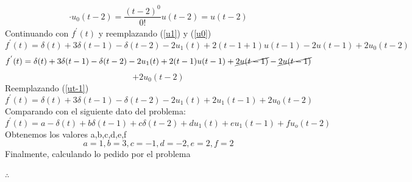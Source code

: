 \documentclass[11pt,a4paper]{article}
\begin{document}
{{\begin{enumerate}
	\begin{eqnarray}
	\label{u0}
	\cdot u_0(t-2)=\dfrac{(t-2)^0}{0!}u(t-2)=u(t-2)
	\end{eqnarray}
	Continuando con $f^{'}(t)$ y reemplazando (\ref{u1}) y (\ref{u0})
	$$f^{'}(t)=\delta(t)+3\delta(t-1)-\delta(t-2)-2u_1(t)+2(t-1+1)u(t-1)-2u(t-1)+2u_0(t-2)$$
	$$f^{'}(t)=\delta(t)+3\delta(t-1)-\delta(t-2)-2u_1(t)+2(t-1)u(t-1)+ \cancel{2u(t-1)}- \cancel{2u(t-1)}$$
	$$+2u_0(t-2)$$
	Reemplazando (\ref{ut-1})
	$$\boxed{f^{'}(t)=\delta(t)+3\delta(t-1)-\delta(t-2)-2u_1(t)+2u_1(t-1)+2u_0(t-2)}$$
	Comparando con el siguiente dato del problema:
	$$f^{'}(t)=a-\delta (t)+b \delta (t-1) +c \delta (t-2) +d u_1(t)+e u_1(t-1)+f u_o(t-2)$$
	Obtenemos los valores a,b,c,d,e,f\\
	$$a=1 , b=3, c=-1, d=-2 , e=2, f=2$$
	Finalmente, calculando lo pedido por el problema\\
	\begin{center}
	$\therefore$ 
	\end{center}
	\end{enumerate} 
	}}
\end{document}
